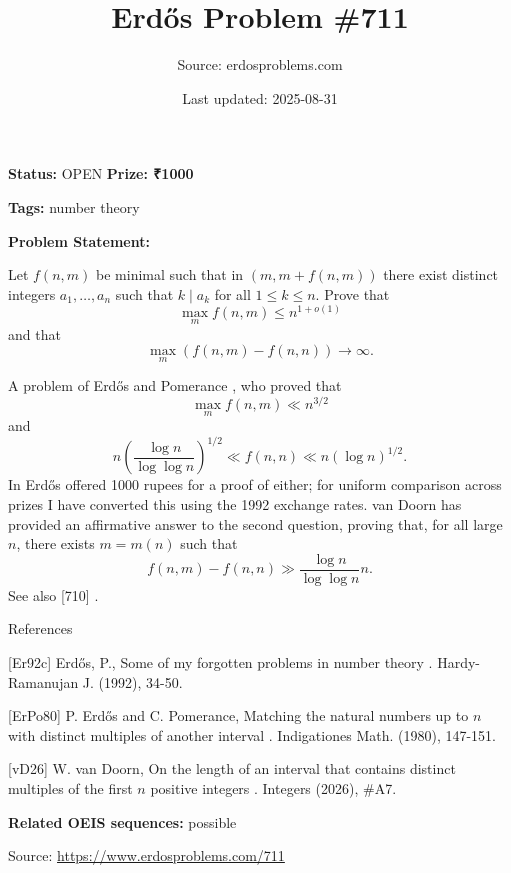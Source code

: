\documentclass{article}
\title{Erd\H{o}s Problem \#711}
\date{Last updated: 2025-08-31}
\author{Source: erdosproblems.com}
\begin{document}
\maketitle

\noindent\textbf{Status:} OPEN \quad \textbf{Prize: ₹1000}

\noindent\textbf{Tags:} number theory

\medskip

\noindent\textbf{Problem Statement:}

Let $f(n,m)$ be minimal such that in $(m,m+f(n,m))$ there exist distinct integers $a_1,\ldots,a_n$ such that $k\mid a_k$ for all $1\leq k\leq n$. Prove that\[\max_m f(n,m) \leq n^{1+o(1)}\]and that\[\max_m (f(n,m)-f(n,n))\to \infty.\]




A problem of Erd\H{o}s and Pomerance \cite{ErPo80}, who proved that\[\max_m f(n,m) \ll n^{3/2}\]and\[n\left(\frac{\log n}{\log\log n}\right)^{1/2} \ll f(n,n)\ll n(\log n)^{1/2}.\]In \cite{Er92c} Erd\H{o}s offered 1000 rupees for a proof of either; for uniform comparison across prizes I have converted this using the 1992 exchange rates. van Doorn \cite{vD26} has provided an affirmative answer to the second question, proving that, for all large $n$, there exists $m=m(n)$ such that\[f(n,m)-f(n,n) \gg \frac{\log n}{\log\log n}n.\]See also [710] .




References

[Er92c] Erd\H{o}s, P., Some of my forgotten problems in number theory . Hardy-Ramanujan J. (1992), 34-50.

[ErPo80] P. Erd\H{o}s and C. Pomerance, Matching the natural numbers up to $n$ with distinct multiples of another interval . Indigationes Math. (1980), 147-151.

[vD26] W. van Doorn, On the length of an interval that contains distinct multiples of the first $n$ positive integers . Integers (2026), #A7.

\noindent\textbf{Related OEIS sequences:} possible


\bigskip
\noindent\small{Source: \url{https://www.erdosproblems.com/711}}
\end{document}
